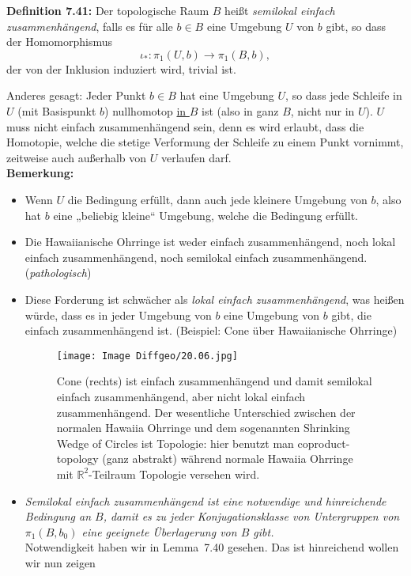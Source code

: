 \documentclass[fleqn, 12pt, letterpaper]{article}
\begin{document}
\textbf{Definition 7.41:} Der topologische Raum \( B \) heißt \emph{semilokal einfach zusammenhängend}, falls es für alle \( b \in B \) eine Umgebung \( U \) von \( b \) gibt, so dass der Homomorphismus
\[
  \iota_* : \pi_1(U, b) \longrightarrow \pi_1(B, b),
\]
der von der Inklusion induziert wird, trivial ist.

\medskip
Anderes gesagt: Jeder Punkt \( b \in B \) hat eine Umgebung \( U \), so dass jede Schleife in \( U \) (mit Basispunkt \( b \)) nullhomotop \underline{in \( B \)} ist (also in ganz \( B \), nicht nur in \( U \)). \( U \) muss nicht einfach zusammenhängend sein, denn es wird erlaubt, dass die Homotopie, welche die stetige Verformung der Schleife zu einem Punkt vornimmt, zeitweise auch außerhalb von $U$ verlaufen darf.\\

\textbf{Bemerkung:}
\begin{itemize}
  \item Wenn \( U \) die Bedingung erfüllt, dann auch jede kleinere Umgebung von \( b \), also hat \( b \) eine „beliebig kleine“ Umgebung, welche die Bedingung erfüllt.
  \item Die Hawaiianische Ohrringe ist weder einfach zusammenhängend, noch lokal einfach zusammenhängend, noch semilokal einfach zusammenhängend. (\emph{pathologisch})
  \item Diese Forderung ist schwächer als \emph{lokal einfach zusammenhängend}, was heißen würde, dass es in jeder Umgebung von \( b \) eine Umgebung von \( b \) gibt, die einfach zusammenhängend ist. (Beispiel: Cone über Hawaiianische Ohrringe)
    \begin{figure}[H]
    \centering
    \texttt{[image: Image Diffgeo/20.06.jpg]}
	\caption{Cone (rechts) ist einfach zusammenhängend und damit semilokal einfach zusammenhängend, aber nicht lokal einfach zusammenhängend. Der wesentliche Unterschied zwischen der normalen Hawaiia Ohrringe und dem sogenannten Shrinking Wedge of Circles ist Topologie: hier benutzt man coproduct-topology (ganz abstrakt) während normale Hawaiia Ohrringe mit $\mathbb{R}^2$-Teilraum Topologie versehen wird.}
 \end{figure}
  
  \item \emph{Semilokal einfach zusammenhängend ist eine notwendige und hinreichende Bedingung an \( B \), damit es zu jeder Konjugationsklasse von Untergruppen von \( \pi_1(B, b_0) \) eine geeignete Überlagerung von \( B \) gibt.}\\
  
  Notwendigkeit haben wir in Lemma~7.40 gesehen. Das ist hinreichend wollen wir nun zeigen
\end{itemize}
\end{document}
